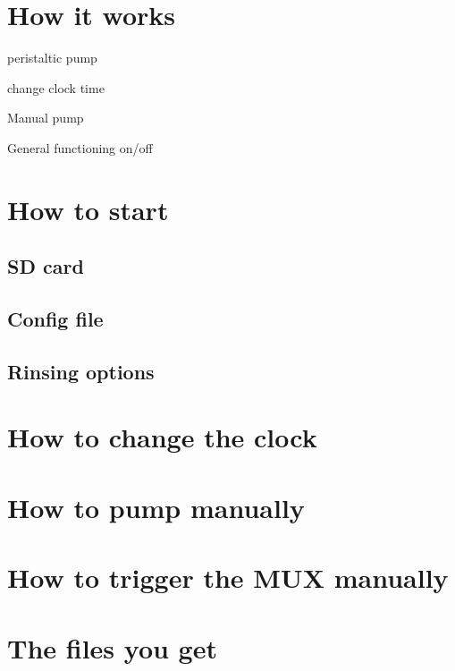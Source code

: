 \documentclass[]{book}
\begin{document}
\hypertarget{how-it-works}{%
\section{How it works}\label{how-it-works}}

peristaltic pump

change clock time

Manual pump

General functioning on/off

\hypertarget{how-to-start}{%
\section{How to start}\label{how-to-start}}

\hypertarget{sd-card}{%
\subsection{SD card}\label{sd-card}}

\hypertarget{config-file}{%
\subsection{Config file}\label{config-file}}

\hypertarget{rinsing-options}{%
\subsection{Rinsing options}\label{rinsing-options}}

\hypertarget{how-to-change-the-clock}{%
\section{How to change the clock}\label{how-to-change-the-clock}}

\hypertarget{how-to-pump-manually}{%
\section{How to pump manually}\label{how-to-pump-manually}}

\hypertarget{how-to-trigger-the-mux-manually}{%
\section{How to trigger the MUX manually}\label{how-to-trigger-the-mux-manually}}

\hypertarget{the-files-you-get}{%
\section{The files you get}\label{the-files-you-get}}
\end{document}
